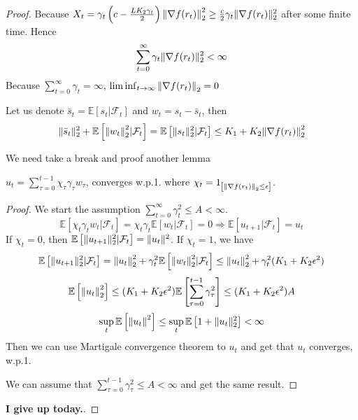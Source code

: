 \begin{theorem}
\begin{proof}
        Because $ X_t = \gamma_t \left( c - \frac{LK_2 \gamma_t}{2}  \right) {\Arrowvert \nabla f(r_t) \Arrowvert}_2^2 \ge \frac{c}{2} \gamma_t \Arrowvert \nabla f(r_t) \Arrowvert^2_2 $ after some finite time. Hence
        \[
            \sum^{\infty}_{t=0} \gamma_t \Arrowvert \nabla f(r_t) \Arrowvert^2_2 < \infty
        \]
        Because $ \sum^{\infty}_{t=0} \gamma_t = \infty $, $ \liminf_{t \rightarrow \infty} {\Arrowvert \nabla f(r_t) \Arrowvert}_2 = 0 $
        
        Let us denote $ \bar s_t = \mathbb{E}\left[ s_t | \mathcal{F}_t \right] $ and $ w_t = s_t - \bar s_t $, then
        \[
            \Arrowvert \bar s_t \Arrowvert^2_2 + \mathbb{E} \left[ {\Arrowvert w_t \Arrowvert}_2^2 | \mathcal{F}_t \right] = \mathbb{E} \left[ \Arrowvert s_t \Arrowvert^2_2 | \mathcal{F}_t \right] \le K_1 + K_2 {\Arrowvert \nabla f(r_t) \Arrowvert}_2^2
        \]
        
        We need take a break and proof another lemma
        \begin{lemma}
            $ u_t = \sum^{t-1}_{\tau = 0} \chi_\tau \gamma_\tau w_{\tau} $, converges w.p.1.
            where $ \chi_t = 1_{\left[ {\Arrowvert \nabla f(r_t) \Arrowvert}_2 \le \epsilon \right]} $.
            \begin{proof}
                We start the assumption $ \sum^{\infty}_{t=0} \gamma^2_t \le A < \infty $.
                \[
                    \mathbb{E}\left[ \chi_t \gamma_t w_t | \mathcal{F}_t \right] = \chi_t \gamma_t \mathbb{E}\left[ w_t | \mathcal{F}_t \right] = 0 \Rightarrow \mathbb{E}\left[ u_{t+1} | \mathcal{F}_t \right] = u_t
                \]
                If $ \chi_t = 0 $, then $ \mathbb{E}\left[ \Arrowvert u_{t+1} \Arrowvert^2_2 | \mathcal{F}_t \right] = \Arrowvert u_t \Arrowvert^2 $. If $ \chi_t = 1 $, we have
                \[
                    \mathbb{E}\left[ \Arrowvert u_{t+1} \Arrowvert^2_2 | \mathcal{F}_t \right]
                    = {\Arrowvert u_t \Arrowvert}_2^2 + \gamma^2_t \mathbb{E}\left[ {\Arrowvert w_t \Arrowvert}_2^2 | \mathcal{F}_t \right] \le {\Arrowvert u_t \Arrowvert}_2^2 + \gamma^2_t (K_1 + K_2 \epsilon^2)
                \]
                \[
                    \mathbb{E}\left[ {\Arrowvert u_t \Arrowvert}_2^2 \right] \le (K_1 + K_2 \epsilon^2) \mathbb{E} \left[ \sum^{t-1}_{\tau = 0} \gamma^2_\tau \right] \le (K_1 + K_2 \epsilon^2)A
                \]
                \[
                    \sup_t \mathbb{E}\left[ {\Arrowvert u_t \Arrowvert}^2 \right] \le \sup_t \mathbb{E} \left[ 1 + \Arrowvert u_t \Arrowvert^2_2 \right] < \infty
                \]
                Then we can use Martigale convergence theorem to $ u_t $ and get that $ u_t $ converges, w.p.1.
                
                We can assume that $ \sum^{t-1}_{\tau = 0} \gamma^2_\tau \le A < \infty $ and get the same result.
            \end{proof}
        \end{lemma}
        \textbf{I give up today.}.
    \end{proof}
\end{theorem}


